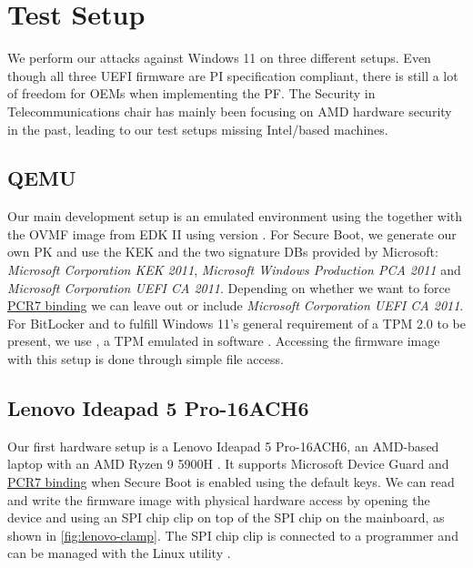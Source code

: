
\chapter{Test Setup}
\label{sec:test-setup}

We perform our attacks against Windows 11 on three different setups.
Even though all three \ac{UEFI} firmware are \ac{PI} specification compliant, there is still a lot of freedom for \acp{OEM} when implementing the \ac{PF}.
The Security in Telecommunications chair has mainly been focusing on \ac{AMD} hardware security in the past, leading to our test setups missing Intel\-/based machines.

\section{\acs{QEMU}}
\label{sec:test-setup:qemu}

Our main development setup is an emulated environment using the  \cite{qemu} together with the \ac{OVMF} image from \ac{EDK} II using version .
For Secure Boot, we generate our own \ac{PK} and use the \ac{KEK} and the two signature \acp{DB} provided by Microsoft: \emph{Microsoft Corporation \acs{KEK}  2011}, \emph{Microsoft Windows Production PCA 2011} and \emph{Microsoft Corporation UEFI CA 2011}.
Depending on whether we want to force \hyperlink{pcr7-binding}{\ac{PCR}7 binding} we can leave out or include \emph{Microsoft Corporation UEFI CA 2011}.
For BitLocker and to fulfill Windows 11's general requirement of a \ac{TPM} 2.0 to be present, we use , a \ac{TPM} emulated in software \cite{swtpm}.
Accessing the firmware image with this setup is done through simple file access.

\section{Lenovo Ideapad 5 Pro-16ACH6}
\label{sec:test-setup:lenovo}

Our first hardware setup is a Lenovo Ideapad 5 Pro-16ACH6, an \ac{AMD}-based laptop with an \ac{AMD} Ryzen 9 5900H \cite{lenovo-ideapad}.
It supports Microsoft Device Guard and \hyperlink{pcr7-binding}{\ac{PCR}7 binding} when Secure Boot is enabled using the default keys.
We can read and write the firmware image with physical hardware access by opening the device and using an \ac{SPI} chip clip on top of the \ac{SPI} chip on the mainboard, as shown in \autoref{fig:lenovo-clamp}.
The \ac{SPI} chip clip is connected to a programmer and can be managed with the Linux utility .

